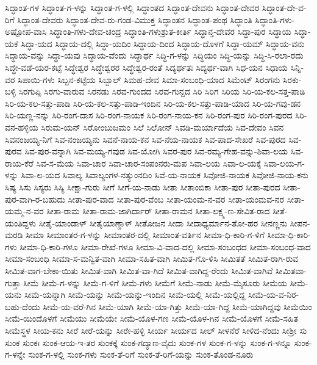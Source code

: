 ಸಿದ್ಧಾಂತ-ಗಳ
ಸಿದ್ಧಾಂತ-ಗ-ಳನ್ನು
ಸಿದ್ಧಾಂತ-ಗ-ಳಲ್ಲಿ
ಸಿದ್ಧಾಂತದ
ಸಿದ್ಧಾಂತ-ದೇವನು
ಸಿದ್ಧಾಂತ-ದೇವರ
ಸಿದ್ಧಾಂತ-ದೇ-ವ-ರಿಗೆ
ಸಿದ್ಧಾಂತ-ದೇವರು
ಸಿದ್ಧಾಂತ-ದೇವ-ರು-ಗಂಡ-ವಿಮುಕ್ತ
ಸಿದ್ಧಾಂತನ
ಸಿದ್ಧಾಂತ-ಪಂಥ
ಸಿದ್ಧಾಂತಿ
ಸಿದ್ಧಾಂತಿ-ಗಳು-ಅಷ್ಟೋಪ-ವಾಸಿ
ಸಿದ್ಧಾಂತಿ-ಗಳು-ದೇವ-ಚಂದ್ರ
ಸಿದ್ಧಾಂತಿ-ಗಳುಶ್ರುತ-ಕೀರ್ತಿ
ಸಿದ್ಧಾನ್ತ-ದೇವರ
ಸಿದ್ಧಾ-ಪುರ
ಸಿದ್ಧಾಯ
ಸಿದ್ಧಾ-ಯಕೆ
ಸಿದ್ಧಾ-ಯದ
ಸಿದ್ಧಾಯ-ದಲ್ಲಿ
ಸಿದ್ಧಾ-ಯದಿಂ
ಸಿದ್ಧಾಯ-ದಿಂದ
ಸಿದ್ಧಾಯ-ದೊಳಗೆ
ಸಿದ್ಧಾ-ಯಮ್
ಸಿದ್ಧಾಯ-ವನು
ಸಿದ್ಧಾಯ-ವನ್ನು
ಸಿದ್ಧಾ-ಯವು
ಸಿದ್ಧಾಯ-ವೆಂದು
ಸಿದ್ಧಾರ್ಥ
ಸಿದ್ಧಿ-ಗ-ಳನ್ನು
ಸಿದ್ಧಿಯಂ
ಸಿದ್ಧಿ-ಯನ್ನು
ಸಿದ್ಧಿ-ಸಿ-ರಲಾ-ರದು
ಸಿದ್ಧೇ-ವಡೆ-ಯರ-ಕಟ್ಟೆ
ಸಿದ್ಧೇಶ್ವರ
ಸಿದ್ಧೇಶ್ವರರ
ಸಿದ್ಧೇಶ್ವರ-ರಂತೆ
ಸಿದ್ಯರ್ಥತಃ
ಸಿದ್ಯರ್ಥ-ವಾಗಿ
ಸಿಧ-ಯನ
ಸಿಧಾಯ
ಸಿನ್ನಿ-ವರ
ಸಿಪಾಯಿ-ಗಳು
ಸಿಬ್ಬನ-ಕಟ್ಟೆಯ
ಸಿಬ್ಬಾಲ್
ಸಿಮಹ-ದೇವ
ಸಿಮಾ-ಸಂಬಂಧಿ-ಯಾದ
ಸಿಮೆಂಟ್
ಸಿರಂಗನು
ಸಿರಕು-ಬಳ್ಳಿ
ಸಿರಗುಪ್ಪಿ
ಸಿರಗು-ವಾರುವ
ಸಿರನಡು
ಸಿರವ-ಗುಂದದ
ಸಿರವ-ಗುನ್ದದ
ಸಿರಿ
ಸಿರಿಗ
ಸಿರಿಯ
ಸಿರಿ-ಯ-ಕಲ-ಸತ್ತ-ಪಾಡಿ
ಸಿರಿ-ಯ-ಕಲ-ಸತ್ತು-ಪಾಡಿ
ಸಿರಿ-ಯ-ಕಲ-ಸತ್ತು-ಪಾಡಿ-ಇಂದಿನ
ಸಿರಿ-ಯ-ಕಲ-ಸತ್ತು-ಪಾಡಿ-ಯಾದ
ಸಿರಿ-ಯ-ಗವು-ಡನ
ಸಿರಿ-ಯಣ್ಣ-ನನ್ನು
ಸಿರಿ-ರಂಗ-ದಾಸ
ಸಿರಿ-ರಂಗ-ನಾಯಕ
ಸಿರಿ-ರಂಗ-ನಾಯ-ಕನ
ಸಿರಿ-ರಂಗ-ಪುರ
ಸಿರಿ-ರಂಗ-ಪುರದ
ಸಿರಿ-ವನ-ಹಳ್ಳಿಯ
ಸಿರುಮ-ಯನ್
ಸಿರೋಂಬುಜಮಂ
ಸಿಲೆ
ಸಿಲೋನ್
ಸಿವಡಿ-ಮರ್ಯಾದೆಯ
ಸಿವ-ದೇವಂ
ಸಿವನ
ಸಿವನಂಜಯ್ಯ-ನಿಗೆ
ಸಿವ-ನಂಜಯ್ಯನು
ಸಿವನೆ-ನಾಯ-ಕನ
ಸಿವ-ನೆಯ-ನಾಯಕ
ಸಿವ-ಪಾದ-ಸೇಖರೆ
ಸಿವ-ಪುರದ
ಸಿವ-ಪುರವ
ಸಿವ-ಪುರ-ವನ್ನಾಗಿ
ಸಿವ-ಮಯ್ಯ-ಗವುಡ
ಸಿವ-ಯೋಗಿ
ಸಿವರ-ಪುರ
ಸಿವ-ರಮ್ಯ-ಗೇಹ-ವನ್ನು-ಶಿವಾ-ಲಯ
ಸಿವ-ರಾಯ-ಕೆರೆ
ಸಿವ-ಸ-ಮೆಯ
ಸಿವಾ-ಚಾರ
ಸಿವಾ-ಚಾರ-ಸಂಪಂನರು-ಮಪ
ಸಿವಾ-ಲಯ
ಸಿವಾ-ಲ-ಯಕ್ಕೆ
ಸಿವಾ-ಲಯ-ಗ-ಳನ್ನು
ಸಿವಾ-ಲ-ಯದ
ಸಿವಾಲ್ಯ
ಸಿವಾಲ್ಯಂಗಳ-ನತ್ಯುಂನದಿಂ
ಸಿವೆ-ಯ-ನಾಯಕ
ಸಿವೋಜಿ-ನಾಯಕ
ಸಿವೋಜಿ-ನಾಯ-ಕನು
ಸಿಷ್ಯ
ಸಿಸು
ಸಿಸ್ಯರು
ಸಿಸ್ಯಿ
ಸೀಕ್ಷಾ-ಗುರು
ಸೀಗೆ
ಸೀಗೆ-ಯ-ನಾಡು
ಸೀತಾ
ಸೀತಾಂಬಿಕಾ
ಸೀತಾ-ಪುರ
ಸೀತಾ-ಪುರದ
ಸೀತಾ-ಪುರ-ವಾಗಿ-ರ-ಬಹುದು
ಸೀತಾ-ಪುರ-ವಾದ
ಸೀತಾ-ಪುರ-ವೆಂಬ
ಸೀತಾ-ಯಂಮ-ನ-ವರ
ಸೀತಾ-ಯಂಮವ-ನರ
ಸೀತಾ-ಯಮ್ಮ-ನ-ವರ
ಸೀತಾ-ರಾಮ
ಸೀತಾ-ರಾಮ-ಜಾಗಿರ್ದಾರ್
ಸೀತಾ-ರಾಮನ
ಸೀತಾ-ಲಕ್ಷ್ಮ-ಣ-ಸೇವಿತ-ರಾದ
ಸೀತೆ-ಯಂತಿದ್ದಳು
ಸೀತೈ-ಯಾಂಡಾಳ್
ಸೀತೈಯಾಣ್ಡಾಳ್
ಸೀತೋಜನ
ಸೀದಾ
ಸೀದಾಧ್ಯರ್ಮಾನ-ತೋ-ಹರ
ಸೀನಣ್ಣನು
ಸೀಪನ-ಮರಡಿ
ಸೀಮಾ
ಸೀಮಾಂತರ-ಗ-ಳನ್ನು
ಸೀಮಾಂತರ-ದಲ್ಲಿ
ಸೀಮಾಂತ-ವರ್ತಿನ
ಸೀಮಾ-ಧಿ-ಕಾರಿ-ಗ-ಳಿಗೆ
ಸೀಮಾ-ಧಿ-ಕಾರಿ-ಗಳು
ಸೀಮಾ-ಧಿ-ಕಾರಿ-ಗಳೂ
ಸೀಮಾ-ರೇಖೆ-ಗಳೂ
ಸೀಮಾ-ವಿ-ವಾದ-ದಲ್ಲಿ
ಸೀಮಾ-ಸಂಬಂಧದ
ಸೀಮಾ-ಸಂಬಂಧ-ವಾದ
ಸೀಮಾ-ಸಂಬಂಧಿ
ಸೀಮಾ-ಸ-ಮನ್ವಿತ-ವಾಗಿ
ಸೀಮಾ-ಸಹಿತ-ವಾಗಿ
ಸೀಮಿತ-ಗೊ-ಳಿಸಿ
ಸೀಮಿತತೆ
ಸೀಮಿತ-ರಾಗಿ-ರುವ
ಸೀಮಿತ-ವಾಗ-ಬೇಕಾ-ಯಿತು
ಸೀಮಿತ-ವಾಗಿ
ಸೀಮಿತ-ವಾ-ಗಿದೆ
ಸೀಮಿತ-ವಾಗಿದ್ದ-ರೆಂದು
ಸೀಮಿತ-ವಾಗಿವೆ
ಸೀಮಿತವಾ-ಗುತ್ತಾ
ಸೀಮೆ
ಸೀಮೆ-ಗ-ಳನ್ನು
ಸೀಮೆ-ಗ-ಳಿಗೆ
ಸೀಮೆ-ಗಳು
ಸೀಮೆಗೆ
ಸೀಮೆ-ನಾಡು
ಸೀಮೆ-ಮೈಸೂರು
ಸೀಮೆಯ
ಸೀಮೆ-ಯನು
ಸೀಮೆ-ಯನ್ನಾಗಿ
ಸೀಮೆ-ಯನ್ನು
ಸೀಮೆ-ಯನ್ನು-ಇಂದಿನ
ಸೀಮೆ-ಯಲ್ಲಿ
ಸೀಮೆ-ಯಲ್ಲಿದ್ದ
ಸೀಮೆ-ಯ-ವ-ನಿರ-ಬಹು-ದೆಂದು
ಸೀಮೆ-ಯ-ವರೆ-ಗಿನ
ಸೀಮೆ-ಯಾಗಿ
ಸೀಮೆ-ಯಾ-ಗಿತ್ತು
ಸೀಮೆ-ಯಾ-ಗಿದ್ದ
ಸೀಮೆ-ಯಾಗಿದ್ದವು
ಸೀಮೆಯಿಂ
ಸೀಮೆ-ಯಿಂದೊಳಗೆ
ಸೀಮೆಯು
ಸೀಮೆಯೇ
ಸೀಮೆ-ಯೊಳ-ಗಣ
ಸೀಮೆ-ಯೊಳ-ಗಿನ
ಸೀಮೆ-ಯೊಳಗೆ
ಸೀಮೆ-ಸಹಿತ
ಸೀಮೆಸ್ಥಳ
ಸೀಯ-ಕನು
ಸೀರೆ
ಸೀರೆ-ಯನ್ನು
ಸೀರೇ-ಹಳ್ಳಿ
ಸೀರ್ಯ
ಸೀರ್ಯದ
ಸೀಲ್
ಸೀಳನೆರೆ
ಸೀಳಿದ-ನೆಂದು
ಸೀಶ್ರೀ
ಸು
ಸುಂಕ
ಸುಂಕಃ
ಸುಂಕ-ಆಯ-ಇ-ತರ
ಸುಂಕಕ್ಕೆ
ಸುಂಕ-ಗದ್ಯಾಣ-ವೈದು
ಸುಂಕ-ಗಳ
ಸುಂಕ-ಗ-ಳನ್ನು
ಸುಂಕ-ಗ-ಳನ್ನೂ
ಸುಂಕ-ಗ-ಳನ್ನೇ
ಸುಂಕ-ಗ-ಳಲ್ಲಿ
ಸುಂಕ-ಗಳು
ಸುಂಕ-ತೆ-ರಿಗೆ
ಸುಂಕ-ತೆ-ರಿಗೆ-ಯನ್ನು
ಸುಂಕ-ತೊಂಡ-ನೂರು
